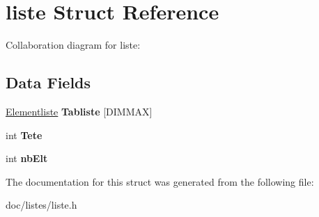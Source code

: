 \hypertarget{structliste}{}\section{liste Struct Reference}
\label{structliste}


Collaboration diagram for liste\+:
\subsection*{Data Fields}
\begin{DoxyCompactItemize}
\item 
\mbox{\label{structliste_a89eea43f7d5d6f5619d94d2cf0ae2833}} 
\hyperlink{structs__arc__p}{Elementliste} {\bfseries Tabliste} \mbox{[}D\+I\+M\+M\+AX\mbox{]}
\item 
\mbox{\label{structliste_ac27f6a14865441ed2e343acc6738aad2}} 
int {\bfseries Tete}
\item 
\mbox{\label{structliste_ac6a9b89b3dd1181842948cdc6a1ee389}} 
int {\bfseries nb\+Elt}
\end{DoxyCompactItemize}


The documentation for this struct was generated from the following file\+:\begin{DoxyCompactItemize}
\item 
doc/listes/liste.\+h\end{DoxyCompactItemize}
